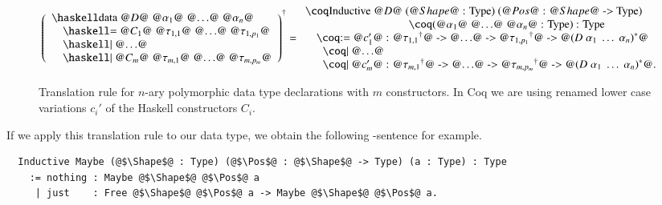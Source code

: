 \begin{figure}[H]
  \[
    \toCoq{\left(
      \begin{array}{ll}
        \haskellM{data @$D$@ @$\alpha_1$@ @$\ldots$@ @$\alpha_n$@}              \\
          \quad\haskellM{= @$C_1$@ @$\tau_{1,1}$@ @$\ldots$@  @$\tau_{1,p_1}$@} \\
          \quad\haskellM{| @$\ldots$@}                                          \\
          \quad\haskellM{| @$C_m$@ @$\tau_{m,1}$@ @$\ldots$@  @$\tau_{m,p_m}$@}
      \end{array}
    \right)}
    = \begin{array}{l}
      \coqM{Inductive @$D$@ (@$\Shape$@ : Type) (@$\Pos$@ : @$\Shape$@ -> Type)}                      \\
      \phantom{\coqM{Inductive @$D$@}}\;\;\coqM{(@$\alpha_1$@ @$\ldots$@ @$\alpha_n$@ : Type) : Type} \\
      \quad\coqM{:= @$c_1'$@ : @$\toCoqX{\tau_{1,1}}$@ -> @$\ldots$@ -> @$\toCoqX{\tau_{1,p_1}}$@ -> @$\toCoqTX{(D\;\alpha_1\;\ldots\;\alpha_n)}$@} \\
      \quad\;\;\coqM{| @$\ldots$@}                                                                                                                             \\
      \quad\;\;\coqM{| @$c_m'$@ : @$\toCoqX{\tau_{m,1}}$@ -> @$\ldots$@ -> @$\toCoqX{\tau_{m,p_m}}$@ -> @$\toCoqTX{(D\;\alpha_1\;\ldots\;\alpha_n)}$@.}
    \end{array}
  \]
  \caption{Translation rule for $n$-ary polymorphic data type declarations with $m$ constructors. In Coq we are using renamed lower case variations $c_i'$ of the Haskell constructors $C_i$.}
  \label{fig:translation:type-decl:data}
\end{figure}

If we apply this translation rule to our  data type, we obtain the following -sentence for example.
\begin{verbatim}
  Inductive Maybe (@$\Shape$@ : Type) (@$\Pos$@ : @$\Shape$@ -> Type) (a : Type) : Type
    := nothing : Maybe @$\Shape$@ @$\Pos$@ a
     | just    : Free @$\Shape$@ @$\Pos$@ a -> Maybe @$\Shape$@ @$\Pos$@ a.
\end{verbatim}

